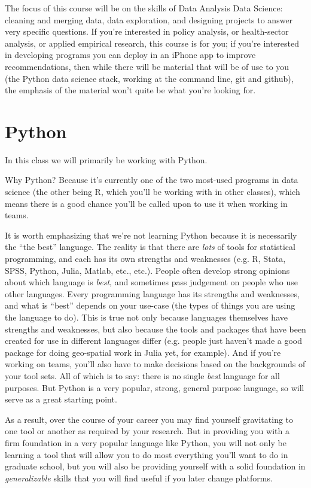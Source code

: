 \documentclass[12pt]{article}
\begin{document}
The focus of this course will be on the skills of Data Analysis Data Science: cleaning and merging data, data exploration, and designing projects to answer very specific questions. If you're interested in policy analysis, or health-sector analysis, or applied empirical research, this course is for you; if you're interested in developing programs you can deploy in an iPhone app to improve recommendations, then while there will be material that will be of use to you (the Python data science stack, working at the command line, git and github), the emphasis of the material won't quite be what you're looking for.





\section{Python}

In this class we will primarily be working with Python.

Why Python? Because it's currently one of the two most-used programs in data science (the other being R, which you'll be working with in other classes), which means there is a good chance you'll be called upon to use it when working in teams.

It is worth emphasizing that we're not learning Python because it is necessarily the ``the best'' language. The reality is that there are \emph{lots} of tools for statistical programming, and each has its own strengths and weaknesses (e.g. R, Stata, SPSS, Python, Julia, Matlab, etc., etc.). People often develop strong opinions about which language is \emph{best}, and sometimes pass judgement on people who use other languages. Every programming language has its strengths and weaknesses, and what is ``best'' depends on your use-case (the types of things you are using the language to do). This is true not only because languages themselves have strengths and weaknesses, but also because the tools and packages that have been created for use in different languages differ (e.g. people just haven't made a good package for doing geo-spatial work in Julia yet, for example). And if you're working on teams, you'll also have to make decisions based on the backgrounds of your tool sets. All of which is to say: there is no single \emph{best} language for all purposes. But Python is a very popular, strong, general purpose language, so will serve as a great starting point.

As a result, over the course of your career you may find yourself gravitating to one tool or another as required by your research. But in providing you with a firm foundation in a very popular language like Python, you will not only be learning a tool that will allow you to do most everything you'll want to do in graduate school, but you will also be providing yourself with a solid foundation in \emph{generalizable} skills that you will find useful if you later change platforms.
\end{document}
